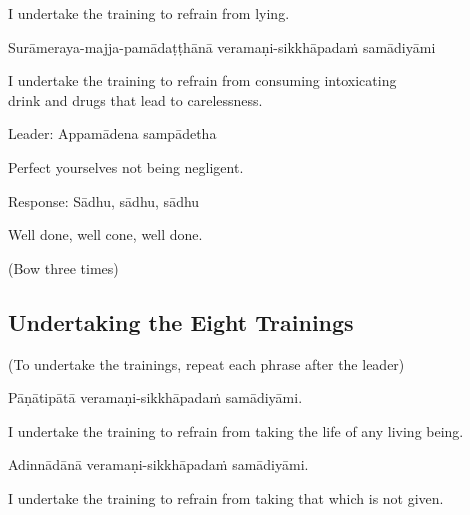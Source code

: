 \begin{english}
  I undertake the training to refrain from lying.
\end{english}

\begin{pali-hang}
Surāmeraya-majja-pamādaṭṭhānā veramaṇi-sikkhāpadaṁ samādiyāmi
\end{pali-hang}

\begin{english-hang}
  I undertake the training to refrain from consuming intoxicating\\
  drink and drugs that lead to carelessness.\hyperlink{endnote137-appendix}{\hypertarget{endnote137-body}{}}
\end{english-hang}

Leader: Appamādena sampādetha

\begin{english}
\hspace{1.4cm} Perfect yourselves not being negligent.
\end{english}

Response: Sādhu, sādhu, sādhu

\begin{english}
\hspace{1.5cm} Well done, well cone, well done.
\end{english}

(Bow three times)

\subsection{Undertaking the Eight Trainings}

(To undertake the trainings, repeat each phrase after the leader)

Pāṇātipātā veramaṇi-sikkhāpadaṁ samādiyāmi.

\begin{english-hang}
  I undertake the training to refrain from taking the life of any living being.
\end{english-hang}

Adinnādānā veramaṇi-sikkhāpadaṁ samādiyāmi.

\begin{english-hang}
  I undertake the training to refrain from taking that which is not given.
\end{english-hang}

